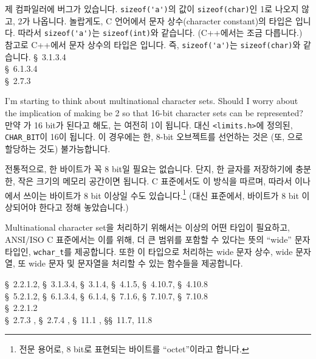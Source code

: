 \begin{faq}
	제 컴파일러에 버그가 있습니다.  \verb+sizeof('a')+의
        값이 \verb+sizeof(char)+인 1로 나오지 않고, 2가 나옵니다.
\A
	놀랍게도, C 언어에서 문자 상수(character constant)의
        타입은 입니다.
	따라서 \verb+sizeof('a')+는 \verb+sizeof(int)+와 같습니다.
        (C++에서는 조금 다릅니다.) 
\T
	참고로 C++에서 문자 상수의 타입은 입니다. 즉,
        \verb+sizeof('a')+는 \verb+sizeof(char)+와 같습니다.
\R
	\cite{ansi} \S\ 3.1.3.4 \\
	\cite{c89} \S\ 6.1.3.4 \\
	\cite{hs} \S\ 2.7.3 
\end{faq}

\begin{faq}
	I'm starting to think about multinational character sets. Should I
        worry about the implication of making  be 2 so that
        16-bit character sets can be represented?
\A
	만약 가 16 bit가 된다고 해도, 는 여전히
        1이 됩니다. 대신 \verb+<limits.h>+에 정의된, \verb+CHAR_BIT+이
        16이 됩니다. 이 경우에는 한, 8-bit 오브젝트를 선언하는 것은 (또,
        으로 할당하는 것도) 불가능합니다.

        전통적으로, 한 바이트가 꼭 8 bit일 필요는 없습니다. 단지, 한 글자를
        저장하기에 충분한, 작은 크기의 메모리 공간이면 됩니다. C 표준에서도
        이 방식을 따르며, 따라서 이나 에서 쓰이는
        바이트가 8 bit 이상일 수도 있습니다.\footnote{전문 용어로, 8 bit로
          표현되는 바이트를 ``octet''이라고 합니다.} (대신 표준에서, 바이트가
        8 bit 이상되어야 한다고 정해 놓았습니다.)

        Multinational character set을 처리하기 위해서는  이상의
        어떤 타입이 필요하고, ANSI/ISO C 표준에서는 이를 위해, 더 큰 범위를
        포함할 수 있다는 뜻의 ``wide'' 문자 타입인, \verb+wchar_t+를
        제공합니다. 또한 이 타입으로 처리하는 wide 문자 상수, wide 문자열,
        또 wide 문자 및 문자열을 처리할 수 있는 함수들을 제공합니다.

\R
	\cite{ansi} \S\ 2.2.1.2, \S\ 3.1.3.4, \S\ 3.1.4, \S\ 4.1.5, \S\ 4.10.7,
                    \S\ 4.10.8 \\
        \cite{c89} \S\ 5.2.1.2, \S\ 6.1.3.4, \S\ 6.1.4, \S\ 7.1.6, \S\ 7.10.7,
                   \S\ 7.10.8 \\
        \cite{rationale} \S\ 2.2.1.2 \\
        \cite{hs} \S\ 2.7.3 , \S\ 2.7.4 , 
                  \S\ 11.1 , \S\S\ 11.7, 11.8 
\end{faq}

%
%

